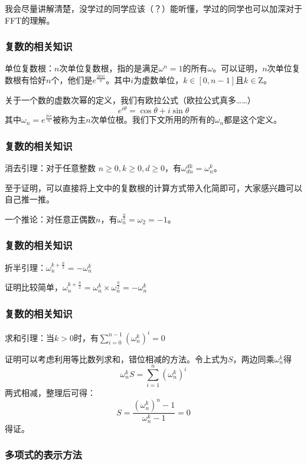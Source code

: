 \documentclass[10pt]{beamer}
\begin{document}
\begin{spacing}{1.2}
\begin{frame}
			我会尽量讲解清楚，没学过的同学应该（？）能听懂，学过的同学也可以加深对于FFT的理解。

		\end{frame}

		\begin{frame}
			\frametitle{复数的相关知识}

			单位复数根：$n$次单位复数根，指的是满足$\omega^n = 1$的所有$\omega$。可以证明，$n$次单位复数根有恰好$n$个，他们是$e^{\frac{2k\pi i}{n}}$。其中$i$为虚数单位，$k \in [0,n-1]$且$k \in \mathrm{Z}$。 \pause

			关于一个数的虚数次幂的定义，我们有欧拉公式（欧拉公式真多……）
			$$e^{i\theta} = \cos \theta + i\sin \theta$$ \pause
			其中$\omega_n = e^{\frac{2i\pi}{n}}$被称为主$n$次单位根。我们下文所用的所有的$\omega_n$都是这个定义。

		\end{frame}

		\begin{frame}
			\frametitle{复数的相关知识}

			消去引理：对于任意整数 $n \geq 0,k \geq 0,d \geq 0$，有$\omega_{dn}^{dk} = \omega_{n}^{k}$。 \pause

			至于证明，可以直接将上文中的复数根的计算方式带入化简即可，大家感兴趣可以自己推一推。 \pause

			一个推论：对任意正偶数$n$，有$\omega_{n}^{\frac{n}{2}} = \omega_2 = -1$。

		\end{frame}

		\begin{frame}
			\frametitle{复数的相关知识}

			折半引理：$\omega_n^{k + \frac{n}{2}} = -\omega_n^k$ \pause

			证明比较简单，$\omega_n^{k + \frac{n}{2}} = \omega_n^k \times \omega_n^{\frac{n}{2}} = -\omega_n^k$
		\end{frame}

		\begin{frame}
			\frametitle{复数的相关知识}

			求和引理：当$k > 0$时，有$\displaystyle\sum_{i=0}^{n-1}(\omega_n^k)^i = 0$ \pause

			证明可以考虑利用等比数列求和，错位相减的方法。令上式为$S$，两边同乘$\omega_n^k$得
			$$\omega_n^k S = \sum\limits_{i=1}^{n}(\omega_n^k)^i$$ \pause
			两式相减，整理后可得：
			$$S = \frac{(\omega_n^k)^n - 1}{\omega_n^k - 1} = 0$$得证。
		\end{frame}
		\begin{frame}
			\frametitle{多项式的表示方法}


\end{frame}
\end{spacing}
\end{document}
